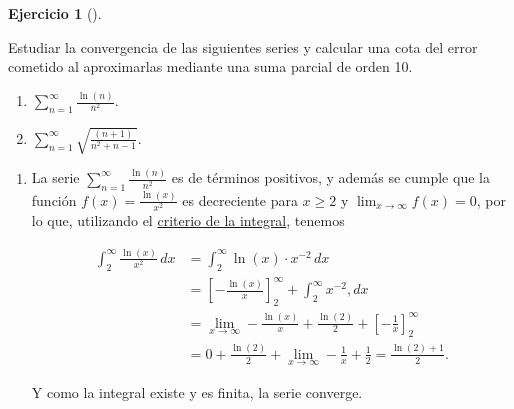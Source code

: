 \documentclass[
  spanish,
  a4paper,
]{scrreport}
\providecommand{\tightlist}{%
  \setlength{\itemsep}{0pt}\setlength{\parskip}{0pt}}
\theoremstyle{definition}
\newtheorem{exercise}{Ejercicio}[chapter]
\theoremstyle{remark}
\begin{document}
\begin{exercise}[]\protect\hypertarget{exr-4}{}\label{exr-4}

Estudiar la convergencia de las siguientes series y calcular una cota
del error cometido al aproximarlas mediante una suma parcial de orden
10.

\begin{enumerate}
\def\labelenumi{\alph{enumi}.}
\tightlist
\item
  \(\displaystyle \sum_{n=1}^\infty \frac{\ln(n)}{n^2}\).
\item
  \(\displaystyle \sum_{n=1}^\infty \sqrt{\frac{(n+1)}{n^2+n-1}}\).
\end{enumerate}

\end{exercise}

\begin{tcolorbox}[enhanced jigsaw, arc=.35mm, bottomrule=.15mm, bottomtitle=1mm, breakable, colback=white, colbacktitle=quarto-callout-tip-color!10!white, colframe=quarto-callout-tip-color-frame, coltitle=black, left=2mm, leftrule=.75mm, opacityback=0, opacitybacktitle=0.6, rightrule=.15mm, title=\textcolor{quarto-callout-tip-color}{\faLightbulb}\hspace{0.5em}{Solución}, titlerule=0mm, toprule=.15mm, toptitle=1mm]

\begin{enumerate}
\def\labelenumi{\alph{enumi}.}
\item
  La serie \(\displaystyle \sum_{n=1}^\infty \frac{\ln(n)}{n^2}\) es de
  términos positivos, y además se cumple que la función
  \(f(x)=\frac{\ln(x)}{x^2}\) es decreciente para \(x \geq 2\) y
  \(\lim_{x\to\infty} f(x) = 0\), por lo que, utilizando el
  \href{https://aprendeconalf.es/analisis-manual/09-series.html\#thm-criterio-integral}{criterio
  de la integral}, tenemos

  \begin{align*}
  \int_2^\infty \frac{\ln(x)}{x^2}\,dx
  &= \int_2^\infty \ln(x) \cdot x^{-2}\,dx \\
  &= \left[-\frac{\ln(x)}{x}\right]_2^\infty + \int_2^\infty x^{-2},dx \tag{Partes}\\
  &= \lim_{x\to\infty}-\frac{\ln(x)}{x} + \frac{\ln(2)}{2} + \left[ -\frac{1}{x} \right]_2^\infty \\
  &= 0 + \frac{\ln(2)}{2} + \lim_{x\to\infty} -\frac{1}{x} + \frac{1}{2}
  = \frac{\ln(2)+1}{2}.
  \end{align*}

  Y como la integral existe y es finita, la serie converge.


\end{enumerate}
\end{tcolorbox}
\end{document}
